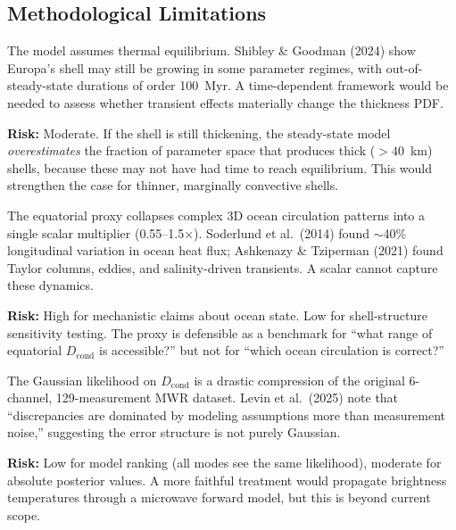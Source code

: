 \documentclass[11pt,letterpaper]{article}
\begin{document}
\subsection{Methodological Limitations}

\begin{critiquebox}
The model assumes thermal equilibrium. Shibley \& Goodman (2024) show Europa's shell may still be growing in some parameter regimes, with out-of-steady-state durations of order 100~Myr. A time-dependent framework would be needed to assess whether transient effects materially change the thickness PDF.

\textbf{Risk:} Moderate. If the shell is still thickening, the steady-state model \textit{overestimates} the fraction of parameter space that produces thick ($> 40$~km) shells, because these may not have had time to reach equilibrium. This would strengthen the case for thinner, marginally convective shells.
\end{critiquebox}

\begin{critiquebox}
The equatorial proxy collapses complex 3D ocean circulation patterns into a single scalar multiplier (0.55--1.5$\times$). Soderlund et al.\ (2014) found $\sim$40\% longitudinal variation in ocean heat flux; Ashkenazy \& Tziperman (2021) found Taylor columns, eddies, and salinity-driven transients. A scalar cannot capture these dynamics.

\textbf{Risk:} High for mechanistic claims about ocean state. Low for shell-structure sensitivity testing. The proxy is defensible as a benchmark for ``what range of equatorial $D_\mathrm{cond}$ is accessible?'' but not for ``which ocean circulation is correct?''
\end{critiquebox}

\begin{critiquebox}
The Gaussian likelihood on $D_\mathrm{cond}$ is a drastic compression of the original 6-channel, 129-measurement MWR dataset. Levin et al.\ (2025) note that ``discrepancies are dominated by modeling assumptions more than measurement noise,'' suggesting the error structure is not purely Gaussian.

\textbf{Risk:} Low for model ranking (all modes see the same likelihood), moderate for absolute posterior values. A more faithful treatment would propagate brightness temperatures through a microwave forward model, but this is beyond current scope.
\end{critiquebox}
\end{document}
